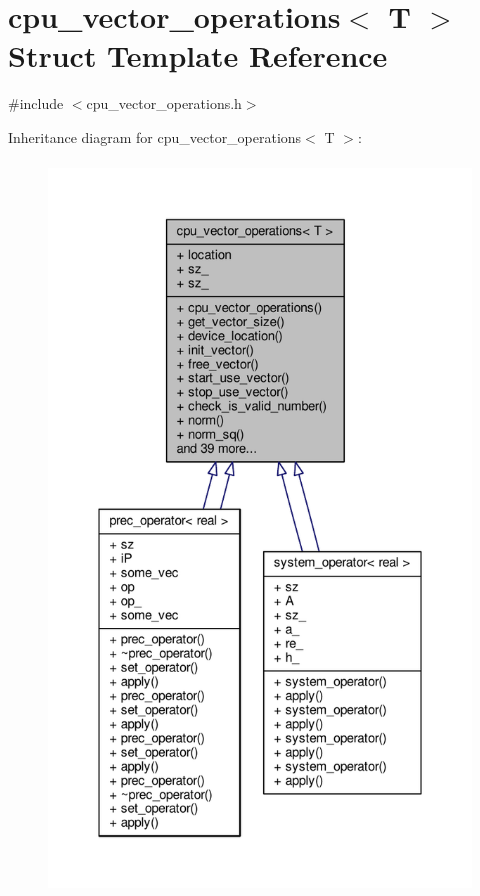 \hypertarget{structcpu__vector__operations}{\section{cpu\-\_\-vector\-\_\-operations$<$ T $>$ Struct Template Reference}
\label{structcpu__vector__operations}
}


{\ttfamily \#include $<$cpu\-\_\-vector\-\_\-operations.\-h$>$}



Inheritance diagram for cpu\-\_\-vector\-\_\-operations$<$ T $>$\-:\nopagebreak
\begin{figure}[H]
\begin{center}
\leavevmode
\includegraphics[height=550pt]{structcpu__vector__operations__inherit__graph}
\end{center}
\end{figure}


